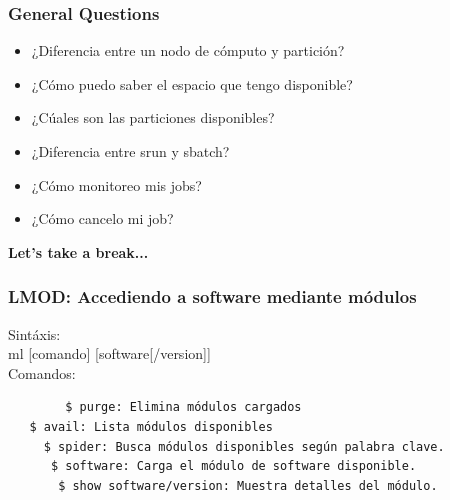 \documentclass[aspectratio=169,professionalfonts]{beamer}
\begin{document}
\begin{frame}[fragile]
\frametitle{\textbf{General Questions}}
\begin{itemize}
    \item ¿Diferencia entre un nodo de cómputo y partición?
     \vspace{0.5em} 
    \item ¿Cómo puedo saber el espacio que tengo disponible?
     \vspace{0.5em} 
    \item ¿Cúales son las particiones disponibles?
     \vspace{0.5em} 
    \item ¿Diferencia entre srun y sbatch?
     \vspace{0.5em} 
    \item ¿Cómo monitoreo mis jobs?
     \vspace{0.5em} 
    \item ¿Cómo cancelo mi job?
\end{itemize}
    
\end{frame}

\begin{frame}[fragile]

\vspace{0.5em} 
\textbf{Let's take a break...}
    
\end{frame}


\begin{frame}[fragile]
\frametitle{\textbf{LMOD: Accediendo a software mediante módulos}}
  Sintáxis: \\ 
  ml [comando]  [software[/version]] \\ 
  Comandos: \\ 

  \begin{verbatim}
        $ purge: Elimina módulos cargados  
   $ avail: Lista módulos disponibles  
     $ spider: Busca módulos disponibles según palabra clave.
      $ software: Carga el módulo de software disponible. 
       $ show software/version: Muestra detalles del módulo.
  \end{verbatim}

\end{frame}
\end{document}
